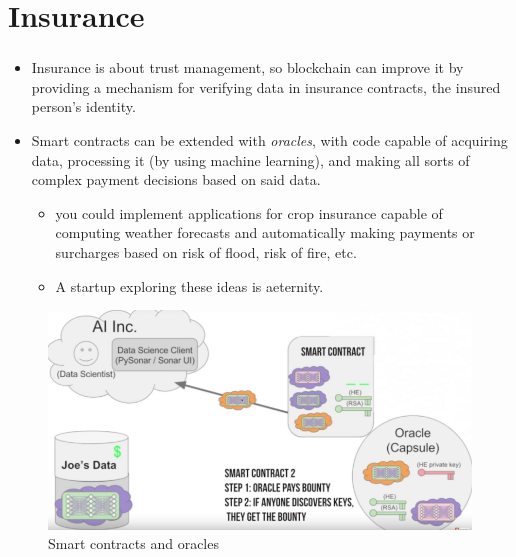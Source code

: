 \documentclass[ 10pt, xcolor = dvipsnames]{beamer}
\begin{document}
\section{Insurance}
\begin{frame}[allowframebreaks]
\frametitle{\insertsection}

\begin{itemize}
\item Insurance is about trust management, so blockchain can improve it by providing a mechanism for verifying data in insurance contracts, \eg the insured person's identity. 
\item Smart contracts can be extended with \emph{oracles}, \ie with code capable of acquiring data, processing it (\eg by using machine learning), and making \linebreak all sorts of complex payment decisions based on said data. 
\begin{itemize}
\item \Eg you could implement applications for crop insurance capable of computing weather forecasts and automatically making payments or surcharges based on risk of flood, risk of fire, etc. 
\item A startup exploring these ideas is aeternity. 
\end{itemize}
\end{itemize}
\framebreak

\begin{figure}
\centering
\includegraphics[width=0.90\columnwidth]{blockchain-oracle.jpg}
\caption{Smart contracts and oracles}
\end{figure}

\end{frame}

\end{document}
